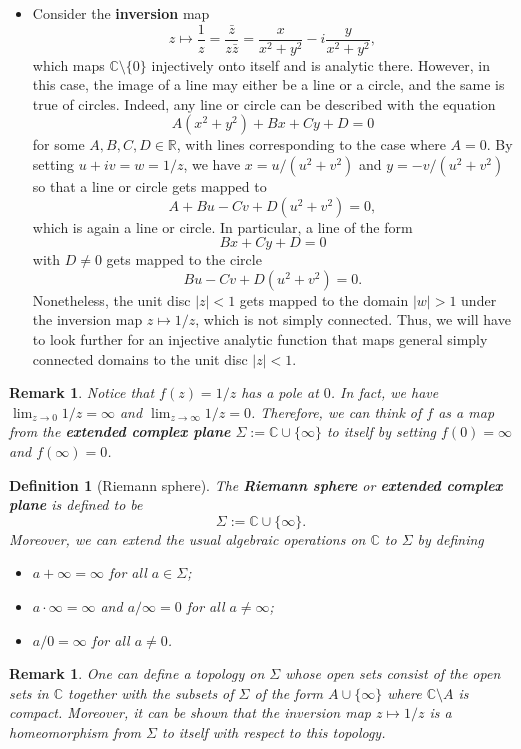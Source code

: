 \documentclass[10pt]{article}
\newcommand{\R}{\mathbb{R}}
\newcommand{\C}{\mathbb{C}}
\theoremstyle{newstyle}
\newtheorem{remark}[thm]{Remark}
\newtheorem{defn}[thm]{Definition}
\begin{document}
\begin{itemize}
\item Consider the {\bf inversion} map 
\[ z \mapsto \frac1z = \frac{\bar z}{z\bar z} = \frac{x}{x^2 + y^2} - i\frac{y}{x^2 + y^2}, \]
which maps $\C \setminus \{0\}$ injectively onto itself and is analytic there. However, in this case, 
the image of a line may either be a line or a circle, and the same is true of circles. Indeed, 
any line or circle can be described with the equation 
\[ A(x^2 + y^2) + Bx + Cy + D = 0 \]
for some $A, B, C, D \in \R$, with lines corresponding to the case where $A = 0$. By setting 
$u + iv = w = 1/z$, we have $x = u/(u^2 + v^2)$ and $y = -v/(u^2 + v^2)$ so that a line or 
circle gets mapped to 
\[ A + Bu - Cv + D(u^2 + v^2) = 0, \]
which is again a line or circle. In particular, a line of the form 
\[ Bx + Cy + D = 0 \]
with $D \neq 0$ gets mapped to the circle 
\[ Bu - Cv + D(u^2 + v^2) = 0. \]
Nonetheless, the unit disc $|z| < 1$ gets mapped to the domain $|w| > 1$ under the inversion 
map $z \mapsto 1/z$, which is not simply connected. Thus, we will have to look further for 
an injective analytic function that maps general simply connected domains to the unit disc $|z| < 1$. 

\end{itemize}

\begin{remark}
Notice that $f(z) = 1/z$ has a pole at $0$. In fact, we have $\lim_{z\to0} 1/z = \infty$ 
and $\lim_{z\to\infty} 1/z = 0$. Therefore, we can think of $f$ as a map from the 
{\bf extended complex plane} $\Sigma := \C \cup \{\infty\}$ to itself by setting 
$f(0) = \infty$ and $f(\infty) = 0$. 
\end{remark}

\begin{defn}[Riemann sphere]
The {\bf Riemann sphere} or {\bf extended complex plane} is defined to be 
\[ \Sigma := \C \cup \{\infty\}. \]
Moreover, we can extend the usual algebraic operations on $\C$ to $\Sigma$ by defining 
\begin{itemize}
    \item $a + \infty = \infty$ for all $a \in \Sigma$; 
    \item $a \cdot \infty = \infty$ and $a / \infty = 0$ for all $a \neq \infty$;
    \item $a / 0 = \infty$ for all $a \neq 0$. 
\end{itemize}
\end{defn}

\begin{remark}
One can define a topology on $\Sigma$ whose open sets consist of the open sets in $\C$ together 
with the subsets of $\Sigma$ of the form $A \cup \{\infty\}$ where $\C \setminus A$ is compact. 
Moreover, it can be shown that the inversion map $z \mapsto 1/z$ is a homeomorphism from 
$\Sigma$ to itself with respect to this topology. 
\end{remark}
\end{document}
